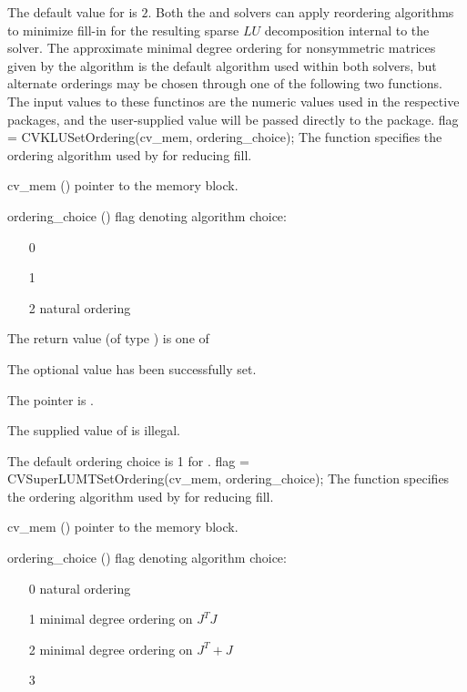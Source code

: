 {
  The default value for  is $2$.
}
Both the {\cvklu} and {\cvsuperlumt} solvers can apply reordering
algorithms to minimize fill-in for the resulting sparse $LU$
decomposition internal to the solver.  The approximate minimal degree
ordering for nonsymmetric matrices given by the  algorithm
is the default algorithm used within both solvers, but alternate
orderings may be chosen through one of the following two functions.
The input values to these functinos are the numeric values used in the respective
packages, and the user-supplied value will be passed directly to the package.
{
  flag = CVKLUSetOrdering(cv\_mem, ordering\_choice);
}
{
  The function  specifies the ordering algorithm
  used by {\cvklu} for reducing fill.
}
{
  \begin{args}[cv\_mem]
  \item[cv\_mem] ()
    pointer to the {\cvodes} memory block.
  \item[ordering\_choice] ()
    flag denoting algorithm choice:
    \begin{itemize}
    \item[0] 
    \item[1] 
    \item[2] natural ordering
    \end{itemize}
  \end{args}
}
{
  The return value  (of type ) is one of
  \begin{args}
  \item[\Id{CVSLS\_SUCCESS}] 
    The optional value has been successfully set.
  \item[\Id{CVSLS\_MEM\_NULL}]
    The  pointer is .
  \item[\Id{CVSLS\_ILL\_INPUT}]
    The supplied value of  is illegal.
  \end{args}
}
{
  The default ordering choice is 1 for .
}
{
  flag = CVSuperLUMTSetOrdering(cv\_mem, ordering\_choice);
}
{
  The function  specifies the ordering algorithm
  used by {\cvsuperlumt} for reducing fill.
}
{
  \begin{args}[cv\_mem]
  \item[cv\_mem] ()
    pointer to the {\cvodes} memory block.
  \item[ordering\_choice] ()
    flag denoting algorithm choice:
    \begin{itemize}
    \item[0] natural ordering
    \item[1] minimal degree ordering on $J^TJ$
    \item[2] minimal degree ordering on $J^T + J$
    \item[3] 
    \end{itemize}
  \end{args}
}
